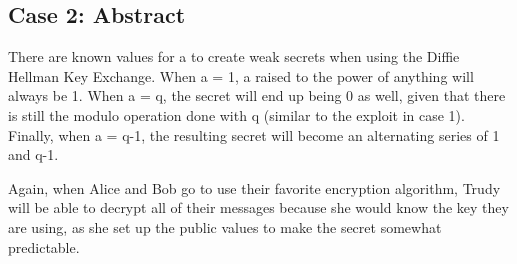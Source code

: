 \documentclass[11pt]{article}
\begin{document}
\subsection*{Case 2: Abstract}

There are known values for a to create weak secrets when using the Diffie Hellman Key Exchange. When a = 1, a raised to the power of anything will always be 1. When a = q, the secret will end up being 0 as well, given that there is still the modulo operation done with q (similar to the exploit in case 1). Finally, when a = q-1, the resulting secret will become an alternating series of 1 and q-1. 

Again, when Alice and Bob go to use their favorite encryption algorithm, Trudy will be able to decrypt all of their messages because she would know the key they are using, as she set up the public values to make the secret somewhat predictable. 
\end{document}
